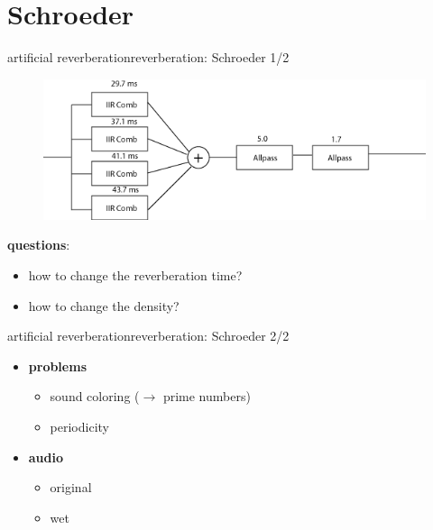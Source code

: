 \section{Schroeder}
\begin{frame}{artificial reverberation}{reverberation: Schroeder 1/2}
		\begin{figure}
			\centerline{\includegraphics[scale=.5]{graph/schroeder}}
		\end{figure}     
		\pause
		\textbf{questions}:
        \smallskip
		
        \begin{itemize}
			\item	how to change the reverberation time?
			\item	how to change the density?
		\end{itemize}
\end{frame}

\begin{frame}{artificial reverberation}{reverberation: Schroeder 2/2}
    \begin{itemize}
        \item   \textbf{problems}
            \begin{itemize}
                \item	sound coloring ($\rightarrow$ prime numbers)
                \item	periodicity
            \end{itemize}
        \pause
        \bigskip
        \item   \textbf{audio}
            \begin{itemize}
                \item   original 
                \item   wet 
            \end{itemize}
    \end{itemize}
\end{frame}

